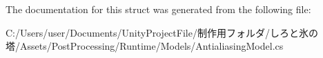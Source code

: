 The documentation for this struct was generated from the following file\+:\begin{DoxyCompactItemize}
\item 
C\+:/\+Users/user/\+Documents/\+Unity\+Project\+File/制作用フォルダ/しろと氷の塔/\+Assets/\+Post\+Processing/\+Runtime/\+Models/Antialiasing\+Model.\+cs\end{DoxyCompactItemize}
